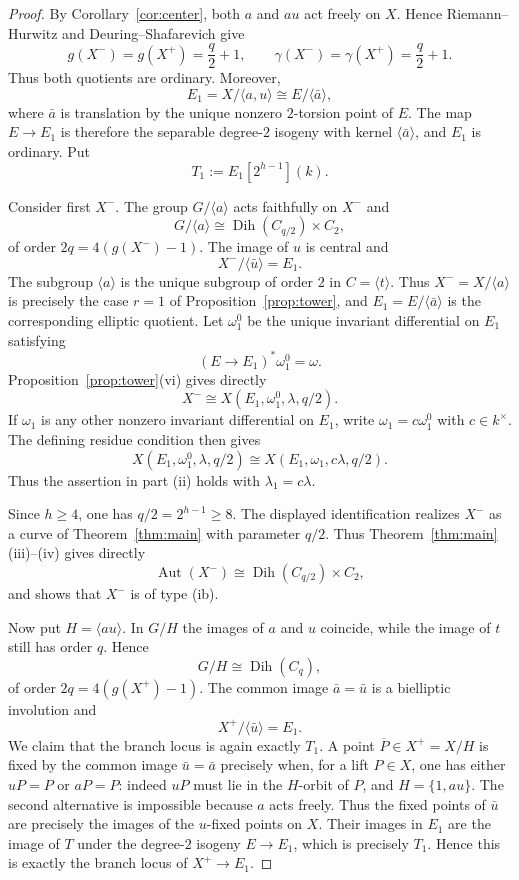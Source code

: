 \documentclass[11pt]{article}
\theoremstyle{remark}
\newcommand{\Aut}{\operatorname{Aut}}
\newcommand{\Dih}{\operatorname{Dih}}
\begin{document}
\begin{proof}
By Corollary~\ref{cor:center}, both $a$ and $au$ act freely on $X$.  Hence
Riemann--Hurwitz and Deuring--Shafarevich give
\[
 g(X^-)=g(X^+)=\frac q2+1,
 \qquad
 \gamma(X^-)=\gamma(X^+)=\frac q2+1.
\]
Thus both quotients are ordinary.  Moreover,
\[
 E_1=X/\langle a,u\rangle
     \cong E/\langle \bar a\rangle,
\]
where $\bar a$ is translation by the unique nonzero $2$-torsion point of
$E$.  The map $E\to E_1$ is therefore the separable degree-$2$ isogeny
with kernel $\langle\bar a\rangle$, and $E_1$ is ordinary.  Put
\[
        T_1:=E_1[2^{h-1}](k).
\]

Consider first $X^-$.  The group $G/\langle a\rangle$ acts faithfully on
$X^-$ and
\[
 G/\langle a\rangle
 \cong \Dih(C_{q/2})\times C_2,
\]
of order $2q=4(g(X^-)-1)$.  The image of $u$ is central and
\[
 X^-/\langle\bar u\rangle=E_1.
\]
The subgroup $\langle a\rangle$ is the unique subgroup of order $2$ in
$C=\langle t\rangle$.  Thus $X^-=X/\langle a\rangle$ is precisely the
case $r=1$ of Proposition~\ref{prop:tower}, and $E_1=E/\langle\bar a\rangle$
is the corresponding elliptic quotient.  Let $\omega_1^0$ be the unique
invariant differential on $E_1$ satisfying
\[
        (E\to E_1)^*\omega_1^0=\omega.
\]
Proposition~\ref{prop:tower}(vi) gives directly
\[
        X^-\cong X(E_1,\omega_1^0,\lambda,q/2).
\]
If $\omega_1$ is any other nonzero invariant differential on $E_1$, write
$\omega_1=c\omega_1^0$ with $c\in k^\times$.  The defining residue
condition then gives
\[
        X(E_1,\omega_1^0,\lambda,q/2)
        \cong X(E_1,\omega_1,c\lambda,q/2).
\]
Thus the assertion in part \textup{(ii)} holds with $\lambda_1=c\lambda$.

Since $h\ge4$, one has $q/2=2^{h-1}\ge8$.  The displayed
identification realizes $X^-$ as a curve of Theorem~\ref{thm:main} with
parameter $q/2$.  Thus Theorem~\ref{thm:main}(iii)--(iv) gives directly
\[
 \Aut(X^-)\cong\Dih(C_{q/2})\times C_2,
\]
and shows that $X^-$ is of type \textup{(ib)}.

Now put $H=\langle au\rangle$.  In $G/H$ the images of $a$ and $u$
coincide, while the image of $t$ still has order $q$.  Hence
\[
 G/H\cong\Dih(C_q),
\]
of order $2q=4(g(X^+)-1)$.  The common image $\bar a=\bar u$ is a
bielliptic involution and
\[
 X^+/\langle\bar u\rangle=E_1.
\]
We claim that the branch locus is again exactly $T_1$.  A point
$\overline P\in X^+=X/H$ is fixed by the common image
$\bar u=\bar a$ precisely when, for a lift $P\in X$, one has either
$uP=P$ or $aP=P$: indeed $uP$ must lie in the $H$-orbit of $P$, and
$H=\{1,au\}$.  The second alternative is impossible because $a$ acts
freely.  Thus the fixed points of $\bar u$ are precisely the images of the
$u$-fixed points on $X$.  Their images in $E_1$ are the image of $T$ under
the degree-$2$ isogeny $E\to E_1$, which is precisely $T_1$.
Hence this is exactly the branch locus of $X^+\to E_1$.


\end{proof}
\end{document}

